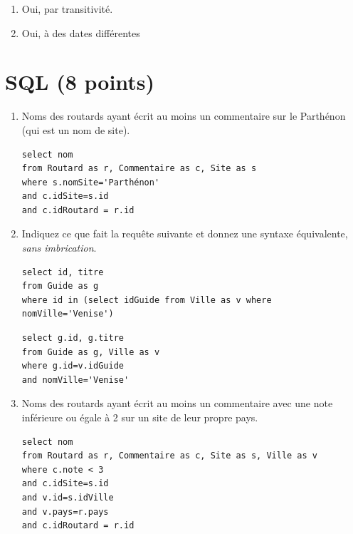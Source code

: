 \begin{solution}
\begin{enumerate}
  \item Oui, par transitivité.
  \item Oui, à des dates différentes
\end{enumerate}

\end{solution}
\section{SQL (8 points)}

\begin{enumerate}

\item Noms des routards ayant  écrit au moins un commentaire sur le Parthénon (qui
est un nom de site).
\begin{solution}
\begin{verbatim}
select nom
from Routard as r, Commentaire as c, Site as s
where s.nomSite='Parthénon'
and c.idSite=s.id
and c.idRoutard = r.id
\end{verbatim}
\end{solution}


\item Indiquez ce que fait  la requête suivante et donnez une syntaxe équivalente, \emph{sans imbrication}.

\begin{verbatim}
select id, titre
from Guide as g
where id in (select idGuide from Ville as v where nomVille='Venise')
\end{verbatim}


\begin{solution}
\begin{verbatim}
select g.id, g.titre
from Guide as g, Ville as v
where g.id=v.idGuide
and nomVille='Venise'
\end{verbatim}
\end{solution}


\item Noms des routards ayant  écrit au moins un commentaire avec une note inférieure ou égale à 2 
   sur un site de leur propre pays.

\begin{solution}
\begin{verbatim}
select nom
from Routard as r, Commentaire as c, Site as s, Ville as v
where c.note < 3
and c.idSite=s.id
and v.id=s.idVille
and v.pays=r.pays
and c.idRoutard = r.id
\end{verbatim}
\end{solution}



\end{enumerate}
